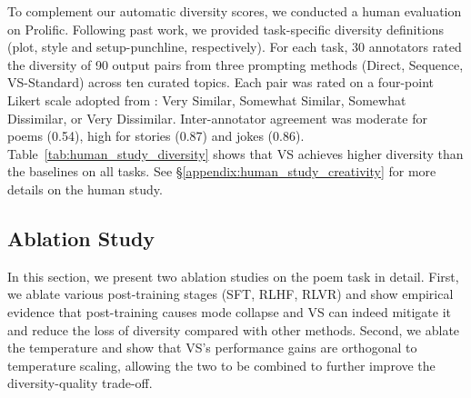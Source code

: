 To complement our automatic diversity scores, we conducted a human evaluation on Prolific. Following past work, we provided task-specific diversity definitions (plot, style and setup-punchline, respectively). 
For each task, 30 annotators rated the diversity of 90 output pairs from three prompting methods (Direct, Sequence, VS-Standard)  across ten curated topics. 
Each pair was rated on a four-point Likert scale adopted from \citet{chen-etal-2022-semeval}: Very Similar, Somewhat Similar, Somewhat Dissimilar, or Very Dissimilar. Inter-annotator agreement was moderate for poems (0.54), high for stories (0.87) and jokes (0.86). 
Table~\ref{tab:human_study_diversity} shows that VS achieves higher diversity than the baselines on all tasks.
See \S\ref{appendix:human_study_creativity} for more details on the human study.

\subsection{Ablation Study}\label{sec:ablation_study}

In this section, we present two ablation studies on the poem task in detail. First, we ablate various post-training stages (SFT, RLHF, RLVR) and show empirical evidence that post-training causes mode collapse and VS can indeed mitigate it and reduce the loss of diversity compared with other methods. Second, we ablate the temperature and show that VS's performance gains are orthogonal to temperature scaling, allowing the two to be combined to further improve the diversity-quality trade-off. %



